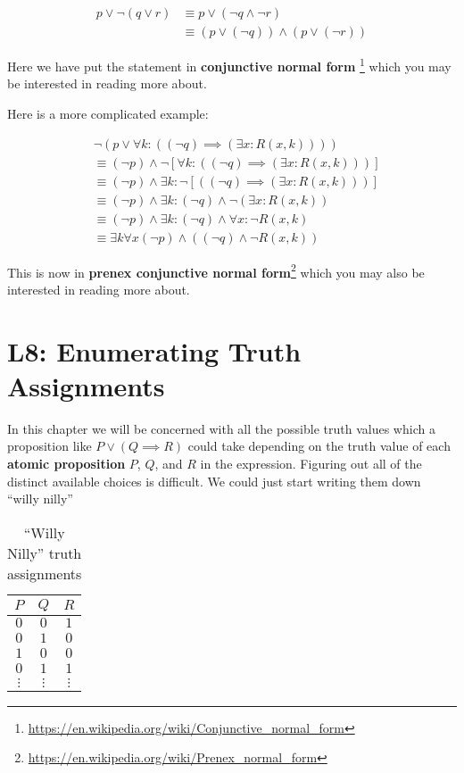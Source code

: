 \begin{example}
		\begin{align*}
			p \vee \neg(q \vee r) & \equiv p \vee (\neg q \wedge \neg r)\\
			&\equiv (p \vee (\neg q)) \wedge (p \vee (\neg r))
			\end{align*}
	\end{example}

Here we have put the statement in \textbf{conjunctive normal form} \footnote{\url{https://en.wikipedia.org/wiki/Conjunctive_normal_form}} which you may be interested in reading more about.

Here is a more complicated example:


		\begin{align*}
		&\neg( p \vee \forall k: ( (\neg q) \implies ( \exists x: R(x, k)) ) ) \\
		&\equiv (\neg p) \wedge \neg [\forall k: ( (\neg q) \implies ( \exists x: R(x, k)) ) ]\\
		&\equiv (\neg p) \wedge  \exists k:  \neg [( (\neg q) \implies ( \exists x: R(x, k)) ) ]\\
		&\equiv (\neg p) \wedge  \exists k:    (\neg q) \wedge \neg ( \exists x: R(x, k))  \\
		&\equiv (\neg p) \wedge  \exists k:    (\neg q) \wedge   \forall x: \neg R(x, k) \\
		&\equiv \exists k \forall x (\neg p) \wedge( (\neg q) \wedge \neg R(x,k))
	\end{align*}

This is now in \textbf{prenex conjunctive normal form}\footnote{\url{https://en.wikipedia.org/wiki/Prenex_normal_form}}  which you may also be interested in reading more about.


\section{L8:  Enumerating Truth Assignments}

In this chapter we will be concerned with all the possible truth values which a proposition like $P \vee (Q \implies R)$ could take depending on the truth value of each \textbf{atomic proposition}  $P$, $Q$, and $R$ in the expression.  Figuring out all of the distinct available choices is difficult.  We could just start writing them down ``willy nilly''

\begin{table}[h!]
	\begin{center}
		\caption{``Willy Nilly'' truth assignments}
		\begin{tabular}{c|c|c} 
			$P$ & $Q$ & $R$ \\
			\hline
			$0$ & $0$ & $1$ \\ 
			$0$ & $1$ & $0$ \\ 
			$1$ & $0$ & $0$ \\ 
			$0$ & $1$ & $1$ \\ 
			$\vdots$ & $\vdots$ & $\vdots$ \\ 
		\end{tabular}
	\end{center}
\end{table}

